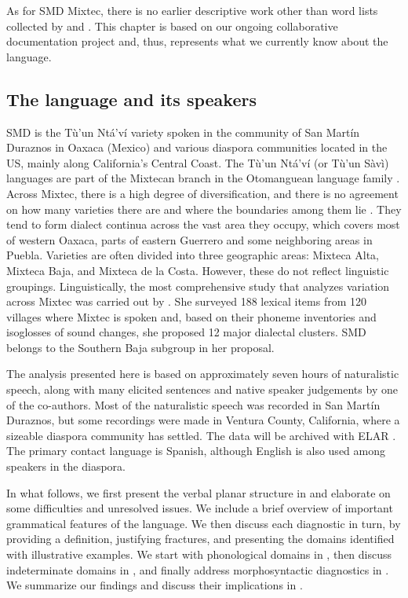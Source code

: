 \documentclass[output=paper]{langscibook}
\begin{document}
As for SMD Mixtec, there is no earlier descriptive work other than word lists collected by \citet{josserand1983mixtec} and \citet{padgett2017tools}. This chapter is based on our ongoing collaborative documentation project and, thus, represents what we currently know about the language. 



\subsection{The language and its speakers} %
\label{sub:language}

SMD is the Tù'un Ntá'ví variety spoken in the community of San Martín Duraznos in Oaxaca (Mexico) and various diaspora communities located in the US, mainly along California's Central Coast. The Tù'un Ntá'ví (or Tù'un Sàvì) languages are part of the Mixtecan branch in the Otomanguean language family \citep{longacre1957proto-mixtecan, kaufman1988otomanguean}. 
Across Mixtec, there is a high degree of diversification, and there is no agreement on how many varieties there are and where the boundaries among them lie \citep{josserand1983mixtec, campbell2017otomanguean}. 
They tend to form dialect continua across the vast area they occupy, which covers most of western Oaxaca, parts of eastern Guerrero and some neighboring areas in Puebla. 
Varieties are often divided into three geographic areas: Mixteca Alta, Mixteca Baja, and Mixteca de la Costa. However, these do not reflect linguistic groupings. Linguistically, the most comprehensive study that analyzes variation across Mixtec was carried out by \citet{josserand1983mixtec}. 
She surveyed 188 lexical items from 120 villages where Mixtec is spoken and, based on their phoneme inventories and isoglosses of sound changes, she proposed 12 major dialectal clusters. SMD belongs to the Southern Baja subgroup in her proposal. 
 
The analysis presented here is based on approximately seven hours of naturalistic speech, along with many elicited sentences and native speaker judgements by one of the co-authors.
Most of the naturalistic speech was recorded in San Martín Duraznos, but some recordings were made in Ventura County, California, where a sizeable diaspora community has settled.    
The data will be archived with ELAR \citep{auderset2022documenting}.
The primary contact language is Spanish, although English is also used among speakers in the diaspora.


In what follows, we first present the verbal planar structure in  and elaborate on some difficulties and unresolved issues. We include a brief overview of important grammatical features of the language.
We then discuss each diagnostic in turn, by providing a definition, justifying fractures, and presenting the domains identified with illustrative examples. We start with phonological domains in , then discuss indeterminate domains in , and finally address morphosyntactic diagnostics in .
We summarize our findings and discuss their implications in .
\end{document}
